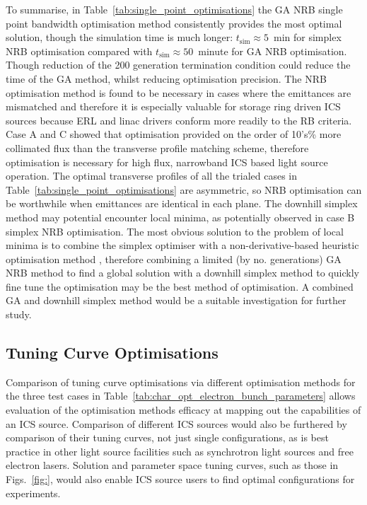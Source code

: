 \documentclass[../main.tex]{subfiles}
\begin{document}
To summarise, in Table~\ref{tab:single_point_optimisations} the GA NRB single point bandwidth optimisation method consistently provides the most optimal solution, though the simulation time is much longer: $t_{\mathrm{sim}}\approx 5$~\si{\minute} for simplex NRB optimisation compared with $t_{\mathrm{sim}}\approx 50$~\si{minute} for GA NRB optimisation. Though reduction of the 200 generation termination condition could reduce the time of the GA method, whilst reducing optimisation precision. The NRB optimisation method is found to be necessary in cases where the emittances are mismatched and therefore it is especially valuable for storage ring driven ICS sources because ERL and linac drivers conform more readily to the RB criteria. Case A and C showed that optimisation provided on the order of 10's\% more collimated flux than the transverse profile matching scheme, therefore optimisation is necessary for high flux, narrowband ICS based light source operation. The optimal transverse profiles of all the trialed cases in Table~\ref{tab:single_point_optimisations} are asymmetric, so NRB optimisation can be worthwhile when emittances are identical in each plane. The downhill simplex method may potential encounter local minima, as potentially observed in case B simplex NRB optimisation. The most obvious solution to the problem of local minima is to combine the simplex optimiser with a non-derivative-based heuristic optimisation method \cite{jones2016design}, therefore combining a limited (by no. generations) GA NRB method to find a global solution with a downhill simplex method to quickly fine tune the optimisation may be the best method of optimisation. A combined GA and downhill simplex method would be a suitable investigation for further study.

\subsection{Tuning Curve Optimisations}

Comparison of tuning curve optimisations via different optimisation methods for the three test cases in Table~\ref{tab:char_opt_electron_bunch_parameters} allows evaluation of the optimisation methods efficacy at mapping out the capabilities of an ICS source. Comparison of different ICS sources would also be furthered by comparison of their tuning curves, not just single configurations, as is best practice in other light source facilities such as synchrotron light sources and free electron lasers. Solution and parameter space tuning curves, such as those in Figs.~\ref{fig:}, would also enable ICS source users to find optimal configurations for experiments. 
\end{document}
